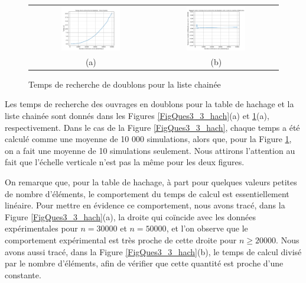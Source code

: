 \documentclass[a4paper,12pt]{article}
\numberwithin{equation}{section}
\begin{document}
\begin{figure}[ht]
\centering
\begin{tabular}{@{} c @{} c @{}}
\includegraphics[width=0.5\textwidth]{FigQues3_3_list_1} & \includegraphics[width=0.5\textwidth]{FigQues3_3_list_2} \tabularnewline
(a) & (b) \tabularnewline
\end{tabular}
\caption{Temps de recherche de doublons pour la liste chainée}
\label{FigQues3_3_list}
\end{figure}

Les temps de recherche des ouvrages en doublons pour la table de hachage et la liste chainée sont donnés dans les Figures \ref{FigQues3_3_hach}(a) et \ref{FigQues3_3_list}(a), respectivement. Dans le cas de la Figure \ref{FigQues3_3_hach}, chaque temps a été calculé comme une moyenne de 10 000 simulations, alors que, pour la Figure \ref{FigQues3_3_list}, on a fait une moyenne de 10 simulations seulement. Nous attirons l'attention au fait que l'échelle verticale n'est pas la même pour les deux figures.

On remarque que, pour la table de hachage, à part pour quelques valeurs petites de nombre d'éléments, le comportement du temps de calcul est essentiellement linéaire. Pour mettre en évidence ce comportement, nous avons tracé, dans la Figure \ref{FigQues3_3_hach}(a), la droite qui coïncide avec les données expérimentales pour $n = 30000$ et $n = 50000$, et l'on observe que le comportement expérimental est très proche de cette droite pour $n \geq 20000$. Nous avons aussi tracé, dans la Figure \ref{FigQues3_3_hach}(b), le temps de calcul divisé par le nombre d'éléments, afin de vérifier que cette quantité est proche d'une constante.
\end{document}

